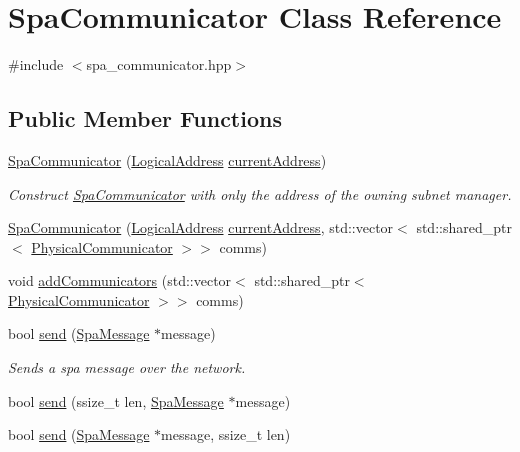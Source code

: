\hypertarget{classSpaCommunicator}{}\section{Spa\+Communicator Class Reference}
\label{classSpaCommunicator}


{\ttfamily \#include $<$spa\+\_\+communicator.\+hpp$>$}

\subsection*{Public Member Functions}
\begin{DoxyCompactItemize}
\item 
\hyperlink{classSpaCommunicator_a4ed78daf6517b608f93dd894b65dab55}{Spa\+Communicator} (\hyperlink{structLogicalAddress}{Logical\+Address} \hyperlink{classSpaCommunicator_a6c00e876564bddf214695d067c20a1f4}{current\+Address})
\begin{DoxyCompactList}\small\item\em Construct \hyperlink{classSpaCommunicator}{Spa\+Communicator} with only the address of the owning subnet manager. \end{DoxyCompactList}\item 
\hyperlink{classSpaCommunicator_a09fa278da37e95831a04896ec24dd227}{Spa\+Communicator} (\hyperlink{structLogicalAddress}{Logical\+Address} \hyperlink{classSpaCommunicator_a6c00e876564bddf214695d067c20a1f4}{current\+Address}, std\+::vector$<$ std\+::shared\+\_\+ptr$<$ \hyperlink{classPhysicalCommunicator}{Physical\+Communicator} $>$$>$ comms)
\item 
void \hyperlink{classSpaCommunicator_a310ae62534090d112e8c3b2d024db83f}{add\+Communicators} (std\+::vector$<$ std\+::shared\+\_\+ptr$<$ \hyperlink{classPhysicalCommunicator}{Physical\+Communicator} $>$$>$ comms)
\item 
bool \hyperlink{classSpaCommunicator_a4a6decf46398e6a749767d75e429c263}{send} (\hyperlink{structSpaMessage}{Spa\+Message} $\ast$message)
\begin{DoxyCompactList}\small\item\em Sends a spa message over the network. \end{DoxyCompactList}\item 
bool \hyperlink{classSpaCommunicator_a349e67dbbea6ee9abae289729a90f2ba}{send} (ssize\+\_\+t len, \hyperlink{structSpaMessage}{Spa\+Message} $\ast$message)
\item 
bool \hyperlink{classSpaCommunicator_ab8ad476b9d99685eccca336c2eb4d87c}{send} (\hyperlink{structSpaMessage}{Spa\+Message} $\ast$message, ssize\+\_\+t len)

\end{DoxyCompactItemize}
